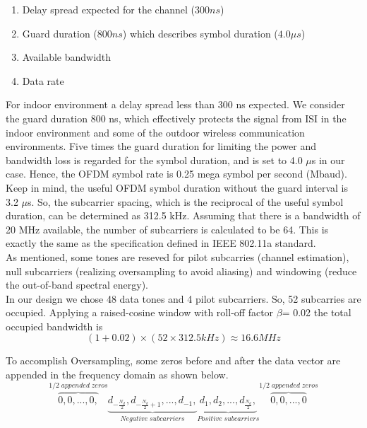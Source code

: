 \begin{enumerate}
  \item Delay spread expected for the channel ($300 ns$)
  \item Guard duration ($800 ns$) which describes symbol duration ($4.0 \mu s$)
  \item Available bandwidth
  \item Data rate
\end{enumerate}

For indoor environment a delay spread less than 300 ns expected. We consider the guard duration 800 ns, which effectively protects the signal from ISI in the indoor environment and some of the outdoor wireless communication environments. Five times the guard duration for limiting the power and bandwidth loss is regarded for the symbol duration, and is set to 4.0 $\mu$s in our case. Hence, the OFDM symbol rate is 0.25 mega symbol per second (Mbaud).\\
Keep in mind, the useful OFDM symbol duration without the guard interval is 3.2 $\mu$s. So, the subcarrier spacing, which is the reciprocal of the useful symbol duration, can be determined as 312.5 kHz. Assuming that there is a bandwidth of 20 MHz available, the number of subcarriers is calculated to be 64. This is exactly the same as the specification defined in IEEE 802.11a standard.\\
As mentioned, some tones are reseved for pilot subcarries (channel estimation), null subcarriers (realizing oversampling to avoid aliasing) and windowing (reduce the out-of-band spectral energy).\\
In our design we chose 48 data tones and 4 pilot subcarriers. So, 52 subcarries are occupied. Applying a raised-cosine window with roll-off factor $\beta$= 0.02 the total occupied bandwidth is\\

\begin{equation} \label{occupied_bw}
(1+ 0.02)\times(52 \times 312.5kHz) \approx 16.6MHz
\end{equation}

To accomplish Oversampling, some zeros before and after the data vector are appended in the frequency domain as shown below.\\

\begin{equation} \label{over_sample}
\overbrace{0, 0, ... , 0,}^{1/2\;appended\;zeros}
\underbrace{d_{-\frac{N_d}{2}}, d_{-\frac{N_d}{2}+1}, ... , d_{-1},}_{Negative\;subcarriers}
\underbrace{d_{1}, d_{2}, ... , d_{\frac{N_d}{2}},}_{Positive\;subcarriers}
\overbrace{0, 0, ... , 0}^{1/2\;appended\;zeros}
\end{equation}

